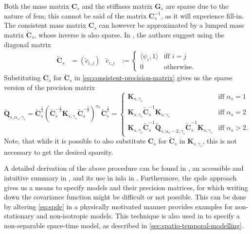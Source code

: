 \documentclass[british]{scrreprt}
\begin{document}
Both the mass matrix \( \symbf{C}_{s} \) and the stiffness matrix \( \symbf{G}_{s} \) are sparse due to the nature of \gls{fem}; this cannot be said of the matrix \( \symbf{C}_{s}^{-1} \), as it will experience fill-in. The consistent mass matrix \( \symbf{C}_{s} \) can however be approximated by a lumped mass matrix \( \symbf{\tilde{C}}_{s} \), whose inverse is also sparse. In \cite{LindgrenexplicitlinkGaussian2011}, the authors suggest using the diagonal matrix
\begin{align}
    \symbf{\tilde{C}}_{s} &= (\tilde{c}_{i, j}) & \tilde{c}_{i, j} &:= \begin{cases}
        \langle \psi_{i}, 1 \rangle & \text{iff } i = j \\
        0                           & \text{otherwise} \text{.}
    \end{cases}
    \label{eq:lumped-mass-matrix}
\end{align}
Substituting \( \symbf{C}_{s} \) for \( \symbf{\tilde{C}}_{s} \) in \cref{eq:consistent-precision-matrix} gives us the sparse version of the precision matrix
\begin{equation}
    \symbf{\tilde{Q}}_{s, \alpha_{s}, \gamma_{s}} = \symbf{\tilde{C}}_{s}^{\frac{1}{2}} \left( \symbf{\tilde{C}}_{s}^{-\frac{1}{2}} \symbf{K}_{s, \gamma_{s}} \symbf{\tilde{C}}_{s}^{-\frac{1}{2}} \right)^{\alpha_{s}} \symbf{\tilde{C}}_{s}^{\frac{1}{2}}= \begin{cases}
        \symbf{K}_{s, \gamma_{s}}
            & \text{iff } \alpha_{s} = 1 \\
        \symbf{K}_{s, \gamma_{s}} \symbf{\tilde{C}}_{s}^{-1} \symbf{K}_{s, \gamma_{s}}
            & \text{iff } \alpha_{s} = 2 \\
        \symbf{K}_{s, \gamma_{s}} \symbf{\tilde{C}}_{s}^{-1} \symbf{\tilde{Q}}_{s, \alpha_{s} - 2, \gamma_{s}} \symbf{\tilde{C}}_{s}^{-1} \symbf{K}_{s, \gamma_{s}}
            & \text{iff } \alpha_{s} > 2
            \text{.}
    \end{cases}
    \label{eq:sparse-precision-matrix}
\end{equation}
Note, that while it is possible to also substitute \( \symbf{C}_s \) for \( \symbf{\tilde{C}}_{s} \) in \( \symbf{K}_{s, \gamma_{s}} \), this is not necessary to get the desired sparsity.

A detailed derivation of the above procedure can be found in \cite{LindgrenexplicitlinkGaussian2011}, an accessible and intuitive summary in \cite{MillerUnderstandingstochasticpartial2020}, and its use in \gls{inla} in \cite{KrainskiAdvancedSpatialModeling2019}. Furthermore, the \gls{spde} approach gives us a means to specify models and their precision matrices, for which writing down the covariance function might be difficult or not possible. This can be done by altering \cref{eq:spde} in a physically motivated manner\textemdash{}\cite{LindgrenexplicitlinkGaussian2011} provides examples for non-stationary and non-isotropic models. This technique is also used in \cite{Lindgrendiffusionbasedspatiotemporalextension2022} to specify a non-separable space-time model, as described in \cref{sec:spatio-temporal-modelling}.
\end{document}
